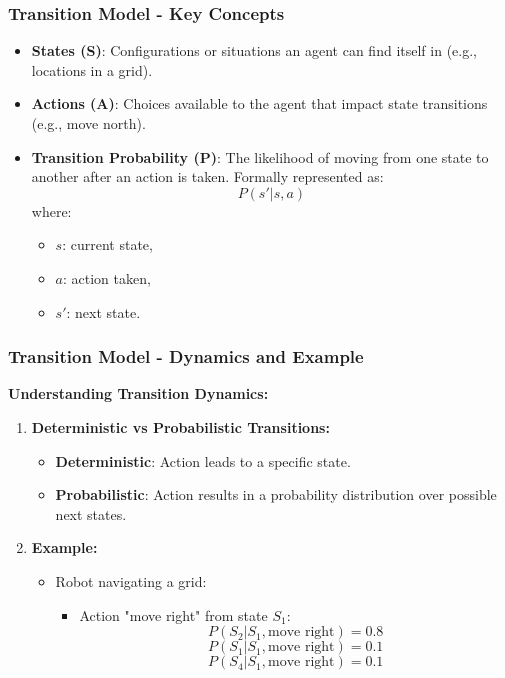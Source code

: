 \documentclass[aspectratio=169]{beamer}
\begin{document}
\begin{frame}[fragile]
    \frametitle{Transition Model - Key Concepts}
    \begin{itemize}
        \item \textbf{States (S)}: Configurations or situations an agent can find itself in (e.g., locations in a grid).
        \item \textbf{Actions (A)}: Choices available to the agent that impact state transitions (e.g., move north).
        \item \textbf{Transition Probability (P)}: The likelihood of moving from one state to another after an action is taken. Formally represented as:
        \[
        P(s' | s, a)
        \]
        where:
        \begin{itemize}
            \item \( s \): current state,
            \item \( a \): action taken,
            \item \( s' \): next state.
        \end{itemize}
    \end{itemize}
\end{frame}

\begin{frame}[fragile]
    \frametitle{Transition Model - Dynamics and Example}
    \textbf{Understanding Transition Dynamics:}
    \begin{enumerate}
        \item \textbf{Deterministic vs Probabilistic Transitions:}
        \begin{itemize}
            \item \textbf{Deterministic}: Action leads to a specific state.
            \item \textbf{Probabilistic}: Action results in a probability distribution over possible next states.
        \end{itemize}
        
        \item \textbf{Example:} 
        \begin{itemize}
            \item Robot navigating a grid:
            \begin{itemize}
                \item Action "move right" from state \( S_1 \):
                \[
                P(S_2 | S_1, \text{{move right}}) = 0.8
                \]
                \[
                P(S_1 | S_1, \text{{move right}}) = 0.1
                \]
                \[
                P(S_4 | S_1, \text{{move right}}) = 0.1
                \]
            \end{itemize}
        \end{itemize}
    \end{enumerate}
\end{frame}
\end{document}
